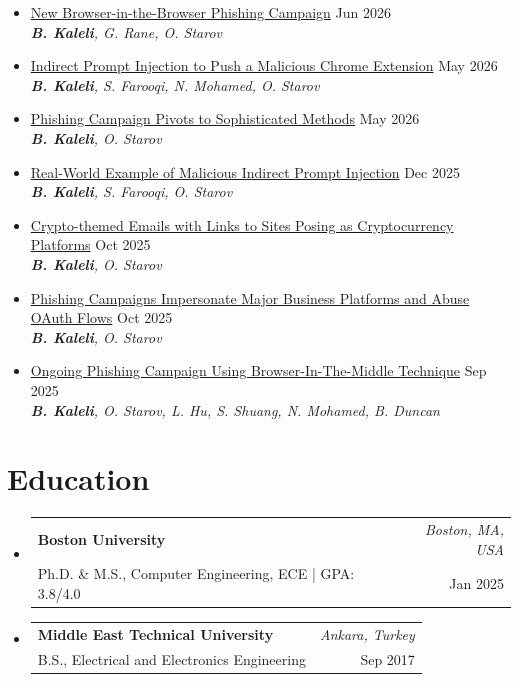 \documentclass[letterpaper,11pt]{article}
\makeatletter
\newcommand{\resumeSubheading}[4]{
  \vspace{-2pt}\item
    \begin{tabular*}{1.0\textwidth}[t]{l@{\extracolsep{\fill}}r}
      \textbf{\small #1} & \textit{\small #2} \\
      {\small#3} & {\small #4} \\
    \end{tabular*}\vspace{-9pt}
}
\newcommand{\resumeBlogHeading}[4]{
    \item \href{#1}{\small #2} \hfill {\small #3}\\
      \textit{\small #4}\vspace{-9pt}
}
\newcommand{\resumeSubHeadingListStart}{\begin{itemize}[leftmargin=0.0in, label={}]}
\newcommand{\resumeSubHeadingListEnd}{\end{itemize}}
\newcommand{\resumeItemListStart}{\begin{itemize}[leftmargin=0.15in, label={$\bullet$}, topsep=0pt]}
\newcommand{\resumeItemListEnd}{\end{itemize}}
\makeatother
\begin{document}
  \resumeItemListStart
    \resumeBlogHeading
        {https://www.linkedin.com/feed/update/urn:li:ugcPost:7469871641158774784}
        {New Browser-in-the-Browser Phishing Campaign}
        {Jun 2026}
        {\textbf{B. Kaleli}, G. Rane, O. Starov}
    \resumeBlogHeading
        {https://www.linkedin.com/feed/update/urn:li:ugcPost:7466239963433734144}
        {Indirect Prompt Injection to Push a Malicious Chrome Extension}
        {May 2026}
        {\textbf{B. Kaleli}, S. Farooqi, N. Mohamed, O. Starov}
    \resumeBlogHeading
        {https://www.linkedin.com/feed/update/urn:li:activity:7458596609900191744}
        {Phishing Campaign Pivots to Sophisticated Methods}
        {May 2026}
        {\textbf{B. Kaleli}, O. Starov}
    \resumeBlogHeading
        {https://www.linkedin.com/posts/unit42_promptinjection-activity-7406438921041018881-OKa5/}
        {Real-World Example of Malicious Indirect Prompt Injection}
        {Dec 2025}
        {\textbf{B. Kaleli}, S. Farooqi, O. Starov}
    \resumeBlogHeading
        {https://www.linkedin.com/feed/update/urn:li:ugcPost:7389779413581746178}
        {Crypto-themed Emails with Links to Sites Posing as Cryptocurrency Platforms}
        {Oct 2025}
        {\textbf{B. Kaleli}, O. Starov}
    \resumeBlogHeading
        {https://www.linkedin.com/feed/update/urn:li:share:7387241426998231040}
        {Phishing Campaigns Impersonate Major Business Platforms and Abuse OAuth Flows}
        {Oct 2025}
        {\textbf{B. Kaleli}, O. Starov}
    \resumeBlogHeading
        {https://www.linkedin.com/posts/unit42_phishing-bitm-activity-7376692047900184577-q9m1/}
        {Ongoing Phishing Campaign Using Browser-In-The-Middle Technique}
        {Sep 2025}
        {\textbf{B. Kaleli}, O. Starov, L. Hu, S. Shuang, N. Mohamed, B. Duncan}
  \resumeItemListEnd
\vspace{0.01in}

\section{Education}
  \resumeSubHeadingListStart
    \resumeSubheading                           
      {Boston University}{Boston, MA, USA}                                          
      {Ph.D. \& M.S., Computer Engineering, ECE | GPA: 3.8/4.0}{Jan 2025}
    \resumeSubheading
      {Middle East Technical University}{Ankara, Turkey}
      {B.S., Electrical and Electronics Engineering}{Sep 2017}
  \resumeSubHeadingListEnd
\vspace{0.01in}
\end{document}
